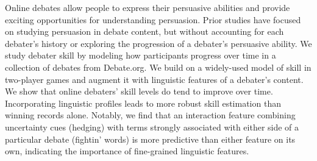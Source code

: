 Online debates allow people to express their persuasive abilities and provide exciting opportunities for understanding persuasion. Prior studies have focused on studying persuasion in debate content, but without accounting for each debater's history or exploring the progression of a debater's persuasive ability. We study debater skill by modeling how participants progress over time in a collection of debates from Debate.org. We build on a widely-used model of skill in two-player games and augment it with linguistic features of a debater's content. We show that online debaters' skill levels do tend to improve over time. Incorporating linguistic profiles leads to more robust skill estimation than winning records alone. Notably, we find that an interaction feature combining uncertainty cues (hedging) with terms strongly associated with either side of a particular debate (fightin' words) is more predictive than either feature on its own, indicating the importance of fine-grained linguistic features.